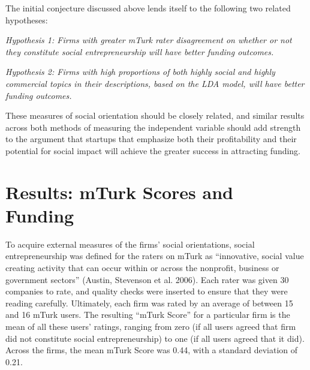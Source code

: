 \documentclass[12pt]{article}
\begin{document}
The initial conjecture discussed above lends itself to the following two related hypotheses:

\textit{Hypothesis 1: Firms with greater mTurk rater disagreement on whether or not they constitute social entrepreneurship will have better funding outcomes.}

\textit{Hypothesis 2: Firms with high proportions of both highly social and highly commercial topics in their descriptions, based on the LDA model, will have better funding outcomes.}

These measures of social orientation should be closely related, and similar results across both methods of measuring the independent variable should add strength to the argument that startups that emphasize both their profitability and their potential for social impact will achieve the greater success in attracting funding.


\section{Results: mTurk Scores and Funding}

To acquire external measures of the firms' social orientations, social entrepreneurship was defined for the raters on mTurk as ``innovative, social value creating activity that can occur within or across the nonprofit, business or government sectors'' (Austin, Stevenson et al. 2006). Each rater was given 30 companies to rate, and quality checks were inserted to ensure that they were reading carefully. Ultimately, each firm was rated by an average of between 15 and 16 mTurk users. The resulting ``mTurk Score'' for a particular firm is the mean of all these users' ratings, ranging from zero (if all users agreed that firm did not constitute social entrepreneurship) to one (if all users agreed that it did). Across the firms, the mean mTurk Score was 0.44, with a standard deviation of 0.21. 
\end{document}

